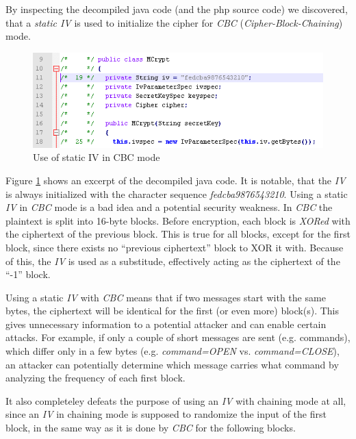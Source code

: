 \documentclass{llncs}
\begin{document}
By inspecting the decompiled java code (and the php source code) we discovered, that a \emph{static IV} is used to initialize the cipher for \emph{CBC} (\emph{Cipher-Block-Chaining}) mode.
\begin{center}
\begin{figure}[hbtp]
        \centering
        \includegraphics[natwidth=162bp,natheight=227bp]{staticIV.png}
        \caption{Use of static IV in CBC mode}\label{figStaticIV}
\end{figure}
\end{center}

Figure \ref{figStaticIV} shows an excerpt of the decompiled java code. It is notable, that the \emph{IV} is always initialized with the character sequence \emph{fedcba9876543210}. Using a static \emph{IV} in \emph{CBC} mode is a bad idea and a potential security weakness. In \emph{CBC} the plaintext is split into 16-byte blocks. Before encryption, each block is \emph{XORed} with the ciphertext of the previous block. This is true for all blocks, except for the first block, since there exists no ``previous ciphertext'' block to XOR it with. Because of this, the \emph{IV} is used as a substitude, effectively acting as the ciphertext of the ``-1'' block.

Using a static \emph{IV} with \emph{CBC} means that if two messages start with the same bytes, the ciphertext will be identical for the first (or even more) block(s). This gives unnecessary information to a potential attacker and can enable certain attacks. For example, if only a couple of short messages are sent (e.g. commands), which differ only in a few bytes (e.g. \emph{command=OPEN} vs. \emph{command=CLOSE}), an attacker can potentially determine which message carries what command by analyzing the frequency of each first block. 

It also completeley defeats the purpose of using an \emph{IV} with chaining mode at all, since an \emph{IV} in chaining mode is supposed to randomize the input of the first block, in the same way as it is done by \emph{CBC} for the following blocks.
\end{document}
